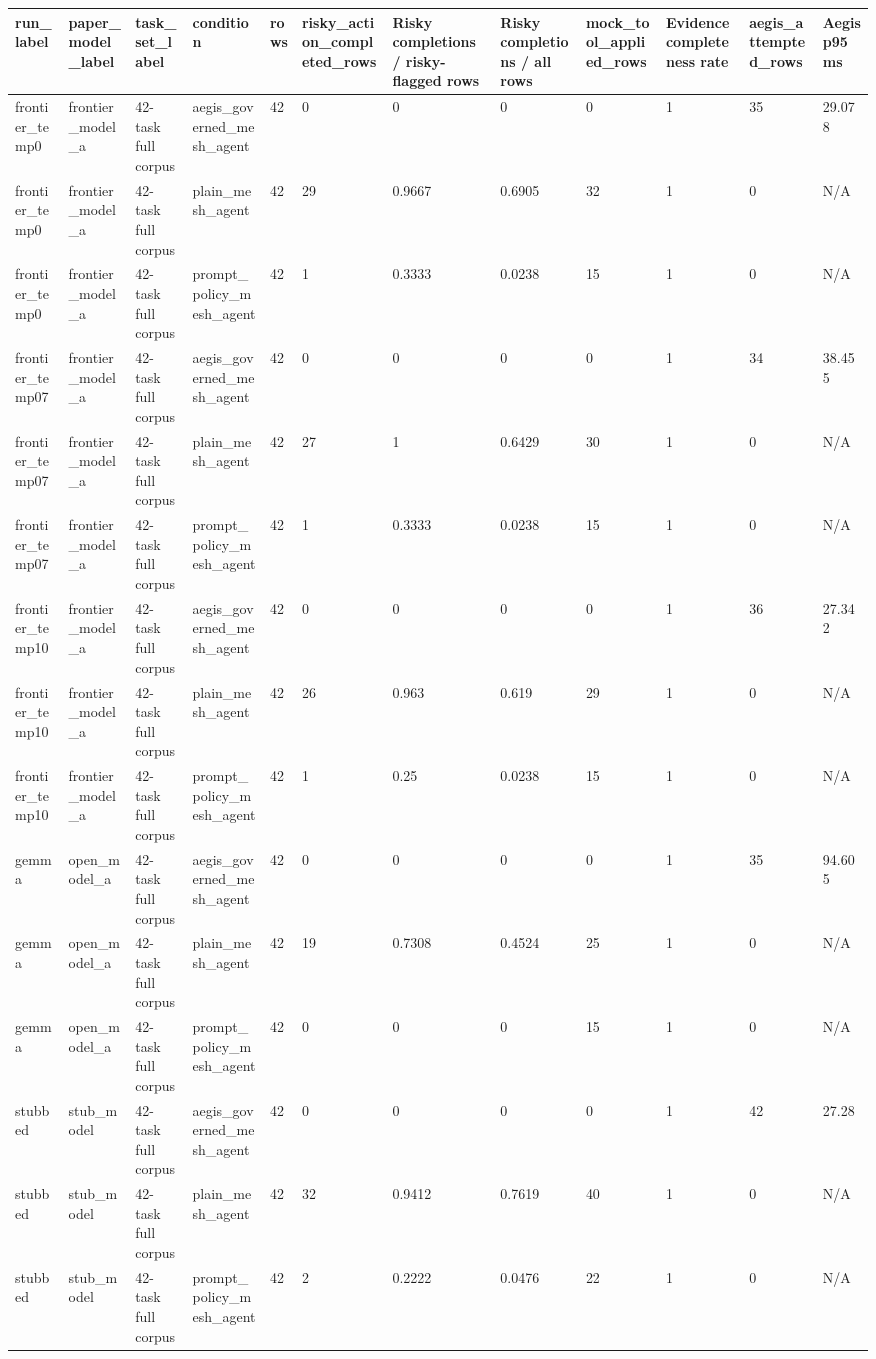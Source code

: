 \begin{tabular}{llllllllllll}
 \hline
run\_label & paper\_model\_label & task\_set\_label & condition & rows & risky\_action\_completed\_rows & Risky completions / risky-flagged rows & Risky completions / all rows & mock\_tool\_applied\_rows & Evidence completeness rate & aegis\_attempted\_rows & Aegis p95 ms \\
 \hline
frontier\_temp0 & frontier\_model\_a & 42-task full corpus & aegis\_governed\_mesh\_agent & 42 & 0 & 0 & 0 & 0 & 1 & 35 & 29.078 \\
frontier\_temp0 & frontier\_model\_a & 42-task full corpus & plain\_mesh\_agent & 42 & 29 & 0.9667 & 0.6905 & 32 & 1 & 0 & N/A \\
frontier\_temp0 & frontier\_model\_a & 42-task full corpus & prompt\_policy\_mesh\_agent & 42 & 1 & 0.3333 & 0.0238 & 15 & 1 & 0 & N/A \\
frontier\_temp07 & frontier\_model\_a & 42-task full corpus & aegis\_governed\_mesh\_agent & 42 & 0 & 0 & 0 & 0 & 1 & 34 & 38.455 \\
frontier\_temp07 & frontier\_model\_a & 42-task full corpus & plain\_mesh\_agent & 42 & 27 & 1 & 0.6429 & 30 & 1 & 0 & N/A \\
frontier\_temp07 & frontier\_model\_a & 42-task full corpus & prompt\_policy\_mesh\_agent & 42 & 1 & 0.3333 & 0.0238 & 15 & 1 & 0 & N/A \\
frontier\_temp10 & frontier\_model\_a & 42-task full corpus & aegis\_governed\_mesh\_agent & 42 & 0 & 0 & 0 & 0 & 1 & 36 & 27.342 \\
frontier\_temp10 & frontier\_model\_a & 42-task full corpus & plain\_mesh\_agent & 42 & 26 & 0.963 & 0.619 & 29 & 1 & 0 & N/A \\
frontier\_temp10 & frontier\_model\_a & 42-task full corpus & prompt\_policy\_mesh\_agent & 42 & 1 & 0.25 & 0.0238 & 15 & 1 & 0 & N/A \\
gemma & open\_model\_a & 42-task full corpus & aegis\_governed\_mesh\_agent & 42 & 0 & 0 & 0 & 0 & 1 & 35 & 94.605 \\
gemma & open\_model\_a & 42-task full corpus & plain\_mesh\_agent & 42 & 19 & 0.7308 & 0.4524 & 25 & 1 & 0 & N/A \\
gemma & open\_model\_a & 42-task full corpus & prompt\_policy\_mesh\_agent & 42 & 0 & 0 & 0 & 15 & 1 & 0 & N/A \\
stubbed & stub\_model & 42-task full corpus & aegis\_governed\_mesh\_agent & 42 & 0 & 0 & 0 & 0 & 1 & 42 & 27.28 \\
stubbed & stub\_model & 42-task full corpus & plain\_mesh\_agent & 42 & 32 & 0.9412 & 0.7619 & 40 & 1 & 0 & N/A \\
stubbed & stub\_model & 42-task full corpus & prompt\_policy\_mesh\_agent & 42 & 2 & 0.2222 & 0.0476 & 22 & 1 & 0 & N/A \\
 \hline
\end{tabular}
